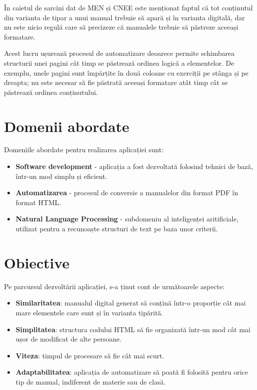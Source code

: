 În caietul de sarcini dat de MEN și CNEE este menționat faptul că tot conținutul din varianta de tipar a unui manual trebuie să apară și în varianta digitală, dar nu este nicio regulă care să precizeze că manualele trebuie să păstreze aceeași formatare.

Acest lucru ușurează procesul de automatizare deoarece permite schimbarea structurii unei pagini cât timp se păstrează ordinea logică a elementelor. De exemplu, unele pagini sunt împărțite în două coloane cu exerciții pe stânga și pe dreapta; nu este necesar să fie păstrată aceeași formatare atât timp cât se păstrează ordinea conținutului.


\section{Domenii abordate}

Domeniile abordate pentru realizarea aplicației sunt:
\begin{itemize}
	\item \textbf{Software development} - aplicația a fost dezvoltată folosind tehnici de bază, într-un mod simplu și eficient.
	\item \textbf{Automatizarea} - procesul de conversie a manualelor din format PDF în format HTML.
	\item \textbf{Natural Language Processing} - subdomeniu al inteligenței aritificiale, utilizat pentru a recunoaște structuri de text pe baza unor criterii.
\end{itemize}

 
\section{Obiective}

Pe parcursul dezvoltării aplicației, s-a ținut cont de următoarele aspecte:
\begin{itemize}
	\item \textbf{Similaritatea}: manualul digital generat să conțină într-o proporție cât mai mare elementele care sunt și în varianta tipărită.
	\item \textbf{Simplitatea}: structura codului HTML să fie organizată într-un mod cât mai ușor de modificat de alte persoane.
	\item \textbf{Viteza}: timpul de procesare să fie cât mai scurt.
	\item \textbf{Adaptabilitatea}: aplicația de automatizare să poată fi folosită pentru orice tip de manual, indiferent de materie sau de clasă.
\end{itemize}


